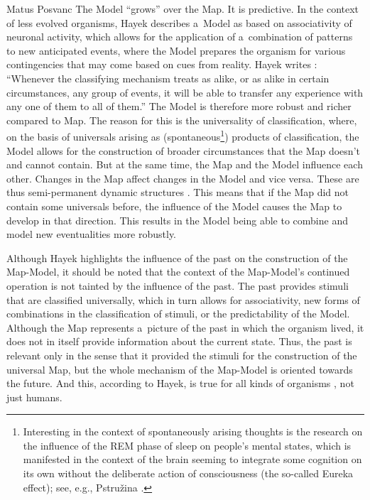 \begin{artengenv}{Matus Posvanc}
The Model ``grows'' over the Map. It is predictive. In the context of less evolved organisms, Hayek describes a~Model as based on associativity of neuronal activity, which allows for the application of a~combination of patterns to new anticipated events, where the Model prepares the organism for various contingencies that may come based on cues from reality. Hayek writes 
\parencite*[][sec.5.87]{Hayek1952Sensory}: %
 ``Whenever the classifying mechanism treats as alike, or as alike in certain circumstances, any group of events, it will be able to transfer any experience with any one of them to all of them.'' The Model is therefore more robust and richer compared to Map. The reason for this is the universality of classification, where, on the basis of universals arising as (spontaneous\footnote{Interesting in the context of spontaneously arising thoughts is the research on the influence of the REM phase of sleep on people's mental states, which is manifested in the context of the brain seeming to integrate some cognition on its own without the deliberate action of consciousness (the so-called Eureka effect); see, e.g., Pstružina 
\parencite*[][]{Pstruzina1994Etudy}.%
}) products of classification, the Model allows for the construction of broader circumstances that the Map doesn't and cannot contain. But at the same time, the Map and the Model influence each other. Changes in the Map affect changes in the Model and vice versa. These are thus semi-permanent dynamic structures 
\parencite[][sec.5.43]{Hayek1952Sensory}. %
 This means that if the Map did not contain some universals before, the influence of the Model causes the Map to develop in that direction. This results in the Model being able to combine and model new eventualities more robustly.



Although Hayek highlights the influence of the past on the construction of the Map-Model, it should be noted that the context of the Map-Model's continued operation is not tainted by the influence of the past. The past provides stimuli that are classified universally, which in turn allows for associativity, new forms of combinations in the classification of stimuli, or the predictability of the Model. Although the Map 
\parencite[][sec.5.42]{Hayek1952Sensory} %
 represents a~picture of the past in which the organism lived, it does not in itself provide information about the current state. Thus, the past is relevant only in the sense that it provided the stimuli for the construction of the universal Map, but the whole mechanism of the Map-Model is oriented towards the future. And this, according to Hayek, is true for all kinds of organisms 
\parencite[][sec.5.61]{Hayek1952Sensory}, %
 not just humans.




\end{artengenv}
